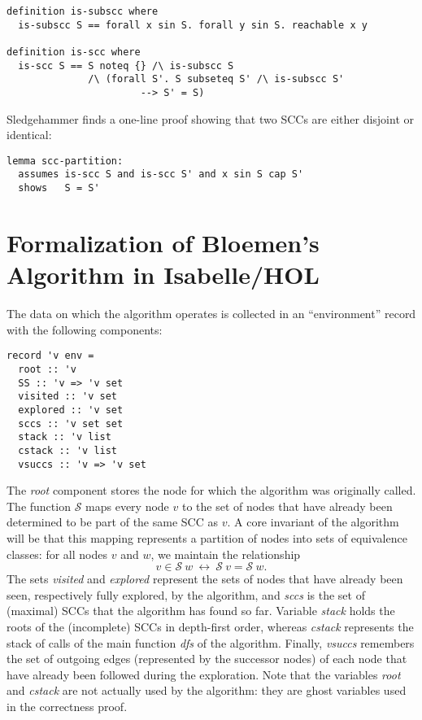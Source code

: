 \documentclass[sigplan,10pt,anonymous,review]{acmart}
\newcommand{\prog}[1]{\textit{#1}}
\renewcommand{\SS}{\mathcal{S}}
\begin{document}
\begin{small}
\begin{lstlisting}[language=isabelle]
definition is-subscc where
  is-subscc S == forall x sin S. forall y sin S. reachable x y

definition is-scc where
  is-scc S == S noteq {} /\ is-subscc S
              /\ (forall S'. S subseteq S' /\ is-subscc S'
                       --> S' = S)
\end{lstlisting}
\end{small}

Sledgehammer finds a one-line proof showing that two SCCs are either disjoint or identical:

\begin{small}
\begin{lstlisting}[language=isabelle]
lemma scc-partition:
  assumes is-scc S and is-scc S' and x sin S cap S'
  shows   S = S'
\end{lstlisting}
\end{small}


\section{Formalization of Bloemen's Algorithm in Isabelle/HOL}
\label{sec:formalization}

The data on which the algorithm operates is collected in an ``environment'' record with the following components:

\begin{small}
\begin{lstlisting}[language=isabelle]
record 'v env =
  root :: 'v
  SS :: 'v => 'v set
  visited :: 'v set
  explored :: 'v set
  sccs :: 'v set set
  stack :: 'v list
  cstack :: 'v list
  vsuccs :: 'v => 'v set
\end{lstlisting}
\end{small}

The \prog{root} component stores the node for which the algorithm was originally called.
The function $\SS$ maps every node $v$ to the set of nodes that have already been determined to be part of the same SCC as $v$. A core invariant of the algorithm will be that this mapping represents a partition of nodes into sets of equivalence classes: for all nodes $v$ and $w$, we maintain the relationship
\[
  v \in \SS~w\ \longleftrightarrow\ \SS~v = \SS~w.
\]
The sets \prog{visited} and \prog{explored} represent the sets of nodes that have already been seen, respectively fully explored, by the algorithm, and \prog{sccs} is the set of (maximal) SCCs that the algorithm has found so far. Variable \prog{stack} holds the roots of the (incomplete) SCCs in depth-first order, whereas \prog{cstack} represents the stack of calls of the main function \prog{dfs} of the algorithm. Finally, \prog{vsuccs} remembers the set of outgoing edges (represented by the successor nodes) of each node that have already been followed during the exploration. Note that the variables \prog{root} and \prog{cstack} are not actually used by the algorithm: they are ghost variables used in the correctness proof.
\end{document}

